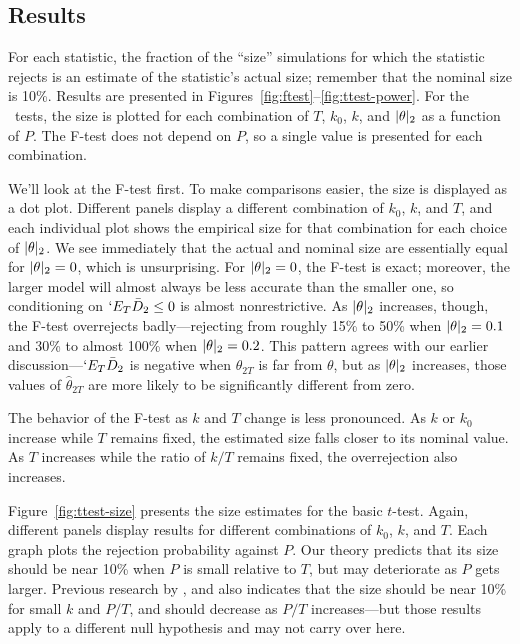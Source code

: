 \documentclass[11pt]{article}
\newcommand{\E}{`E}
\begin{document}
\subsection{Results}
For each statistic, the fraction of the ``size'' simulations for which
the statistic rejects is an estimate of the statistic's actual
size; remember that the nominal size is 10\%.  Results are presented
in Figures~\ref{fig:ftest}--\ref{fig:ttest-power}.  For the \oos\
tests, the size is plotted for each combination of $T$, $k_0$, $k$,
and $\lvert \theta \rvert_2$ as a function of $P$.  The F-test does
not depend on $P$, so a single value is presented for each
combination.

We'll look at the F-test first.  To make comparisons easier, the size
is displayed as a dot plot.  Different panels display a different
combination of $k_0$, $k$, and $T$, and each individual plot shows the
empirical size for that combination for each choice of $\lvert \theta \rvert_2$.
We see immediately that the actual and nominal size are essentially
equal for $\lvert \theta \rvert_2 = 0$, which is unsurprising.  For $\lvert \theta \rvert_2 =
0$, the F-test is exact; moreover, the larger model will almost always
be less accurate than the smaller one, so conditioning on $\E_T
\bar{D}_2 \leq 0$ is almost nonrestrictive.  As $\lvert \theta \rvert_2$
increases, though, the F-test overrejects badly---rejecting from
roughly 15\% to 50\% when $\lvert \theta \rvert_2 = 0.1$ and 30\% to almost 100\%
when $\lvert \theta \rvert_2 = 0.2$.  This pattern agrees with our earlier
discussion---$\E_T \bar D_2$ is negative when $\hat\theta_{2T}$ is far
from $\theta$, but as $\lvert \theta \rvert_2$ increases, those values of
$\hat\theta_{2T}$ are more likely to be significantly different from
zero.

The behavior of the F-test as $k$ and $T$ change is less pronounced.
As $k$ or $k_0$ increase while $T$ remains fixed, the estimated size
falls closer to its nominal value.  As $T$ increases while the ratio of
$k/T$ remains fixed, the overrejection also increases.

Figure~\ref{fig:ttest-size} presents the size estimates for the basic
$t$-test.  Again, different panels display results for different
combinations of $k_0$, $k$, and $T$.  Each graph plots the rejection
probability against $P$.  Our theory predicts that its size should be near 10\% when $P$
is small relative to $T$, but may deteriorate as $P$ gets larger.
Previous research by \citet{clark_tests_2001},
\citet{clark_using_2006,clark_approximately_2007} and
\citet{mccracken_asymptotics_2007} also indicates that the size should
be near 10\% for small $k$ and $P/T$, and should decrease as $P/T$
increases---but those results apply to a different null hypothesis and
may not carry over here.
\end{document}
